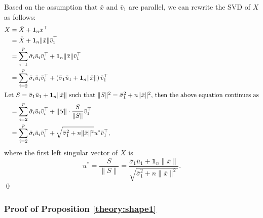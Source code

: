 \documentclass[11pt]{article}
\newcommand{\bfone}{\mathbf{1}}
\begin{document}
Based on the assumption that $\bar{x}$ and $\bar{v}_1$ are parallel, we can rewrite the SVD of $X$ as follows:
\begin{align*}
	X &= \bar{X} + \bfone_n \bar{x}^\top\\
	&= \bar{X} + \bfone_n \|\bar{x}\| \bar{v}_1^\top \\
	&= \sum_{i=1}^p \bar{\sigma}_i \bar{u}_i \bar{v}_i^\top + \bfone_n \|\bar{x} \| \bar{v}_1^\top \\
	&= \sum_{i=2}^p \bar{\sigma}_i \bar{u}_i \bar{v}_i^\top + \left( \bar{\sigma}_1 \bar{u}_1 +  \bfone_n \|\bar{x} \|\right) \bar{v}_1^\top\\
	\intertext{Let $S = \bar{\sigma}_1 \bar{u}_1 + \bfone_n \|\bar{x}\|$ such that $\|S\|^2 = \bar{\sigma}_1^2 + n \|\bar{x}\|^2$, then the above equation continues as} 
	&= \sum_{i=2}^p \bar{\sigma}_i \bar{u}_i \bar{v}_i^\top + \|S\| \cdot \frac{S}{\|S\|} \bar{v}_1^\top \\
	&= \sum_{i=2}^p \bar{\sigma}_i \bar{u}_i \bar{v}_i^\top + \sqrt{\bar{\sigma }_1^2 + n\|\bar{x}\|^2} u^* \bar{v}_1^\top,
\end{align*}
where the first left singular vector of $X$ is 
\begin{equation*}
	u^* = \frac{S}{\|S\|} = \frac{\bar{\sigma}_1 \bar{u}_1 + \bfone_n \|\bar{x}\|}{\sqrt{\bar{\sigma }_1^2 + n\|\bar{x}\|^2}}. 
\end{equation*}\qed 

\subsubsection*{Proof of Proposition \ref{theory:shape1}}
\end{document}

